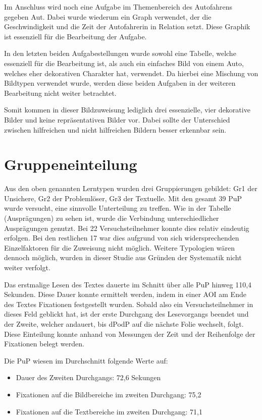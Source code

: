 Im Anschluss wird noch eine Aufgabe im Themenbereich des Autofahrens gegeben \gls{Aut}. Dabei wurde wiederum ein Graph verwendet, der die Geschwindigkeit und die Zeit der Autofahrerin in Relation setzt. Diese Graphik ist essenziell für die Bearbeitung der Aufgabe. 


In den letzten beiden Aufgabestellungen wurde sowohl eine Tabelle, welche essenziell für die Bearbeitung ist, als auch ein einfaches Bild von einem Auto, welches eher dekorativen Charakter hat, verwendet. Da hierbei eine Mischung von Bildtypen verwendet wurde, werden diese beiden Aufgaben in der weiteren Bearbeitung nicht weiter betrachtet. 

Somit kommen in dieser Bildzuweisung lediglich drei essenzielle, vier dekorative Bilder und keine repräsentativen Bilder vor. Dabei sollte der Unterschied zwischen hilfreichen und nicht hilfreichen Bildern besser erkennbar sein.


\section{Gruppeneinteilung}

Aus den oben genannten Lerntypen wurden drei Gruppierungen gebildet: \gls{Gr1} der Unsichere, \gls{Gr2} der Problemlöser, \gls{Gr3} der Textuelle. Mit den gesamt 39 \gls{PuP} wurde versucht, eine sinnvolle Unterteilung zu treffen. Wie in der Tabelle (Ausprägungen) zu sehen ist, wurde die Verbindung unterschiedlicher Ausprägungen genutzt. Bei 22 Versuchsteilnehmer konnte dies relativ eindeutig erfolgen. Bei den restlichen 17 war dies aufgrund von sich widersprechenden Einzelfaktoren für die Zuweisung nicht möglich. Weitere Typologien wären dennoch möglich, wurden in dieser Studie aus Gründen der Systematik nicht weiter verfolgt.

Das erstmalige Lesen des Textes dauerte im Schnitt über alle \gls{PuP} hinweg 110,4 Sekunden. Diese Dauer konnte ermittelt werden, indem in einer AOI am Ende des Textes Fixationen festgestellt wurden. Sobald also ein Versuchsteilnehmer in dieses Feld geblickt hat, ist der erste Durchgang des Lesevorgangs beendet und der Zweite, welcher andauert, bis \gls{dPodP} auf die nächste Folie wechselt, folgt. Diese Einteilung konnte anhand von Messungen der Zeit und der Reihenfolge der Fixationen belegt werden. 


Die \gls{PuP} wiesen im Durchschnitt folgende Werte auf:
    \begin{itemize}
        \item Dauer des Zweiten Durchgangs: 72,6 Sekungen 
        \item Fixationen auf die Bildbereiche im zweiten Durchgang: 75,2
        \item Fixationen auf die Textbereiche im zweiten Durchgang: 71,1
    \end{itemize}

